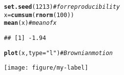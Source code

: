 \documentclass{mbie-word}\usepackage[]{graphicx}\usepackage[]{color}
\makeatletter
\def\maxwidth{ %
  \ifdim\Gin@nat@width>\linewidth
    \linewidth
  \else
    \Gin@nat@width
  \fi
}
\newcommand{\hlnum}[1]{\textcolor[rgb]{0.686,0.059,0.569}{#1}}%
\newcommand{\hlstr}[1]{\textcolor[rgb]{0.192,0.494,0.8}{#1}}%
\newcommand{\hlcom}[1]{\textcolor[rgb]{0.678,0.584,0.686}{\textit{#1}}}%
\newcommand{\hlstd}[1]{\textcolor[rgb]{0.345,0.345,0.345}{#1}}%
\newcommand{\hlkwb}[1]{\textcolor[rgb]{0.69,0.353,0.396}{#1}}%
\newcommand{\hlkwc}[1]{\textcolor[rgb]{0.333,0.667,0.333}{#1}}%
\newcommand{\hlkwd}[1]{\textcolor[rgb]{0.737,0.353,0.396}{\textbf{#1}}}%
\newenvironment{kframe}{%
 \def\at@end@of@kframe{}%
 \ifinner\ifhmode%
  \def\at@end@of@kframe{\end{minipage}}%
  \begin{minipage}{\columnwidth}%
 \fi\fi%
 \def\FrameCommand##1{\hskip\@totalleftmargin \hskip-\fboxsep
 \colorbox{shadecolor}{##1}\hskip-\fboxsep
     \hskip-\linewidth \hskip-\@totalleftmargin \hskip\columnwidth}%
 \MakeFramed {\advance\hsize-\width
   \@totalleftmargin\z@ \linewidth\hsize
   \@setminipage}}%
 {\par\unskip\endMakeFramed%
 \at@end@of@kframe}
\newenvironment{knitrout}{}{} %
\makeatother
\begin{document}
\begin{knitrout}
\color{fgcolor}\begin{kframe}
\begin{alltt}
\hlkwd{set.seed}\hlstd{(}\hlnum{1213}\hlstd{)}  \hlcom{# for reproducibility}
\hlstd{x} \hlkwb{=} \hlkwd{cumsum}\hlstd{(}\hlkwd{rnorm}\hlstd{(}\hlnum{100}\hlstd{))}
\hlkwd{mean}\hlstd{(x)}  \hlcom{# mean of x}
\end{alltt}
\begin{verbatim}
## [1] -1.94
\end{verbatim}
\begin{alltt}
\hlkwd{plot}\hlstd{(x,} \hlkwc{type} \hlstd{=} \hlstr{"l"}\hlstd{)}  \hlcom{# Brownian motion}
\end{alltt}
\end{kframe}
\texttt{[image: figure/my-label]} 

\end{knitrout}






\end{document}
